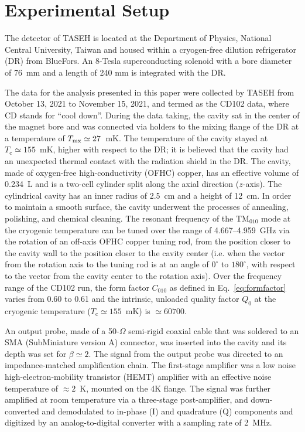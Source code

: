 
\section{Experimental Setup}\label{sec:taseh} 
The detector of TASEH is located at the Department of Physics, National 
Central University, Taiwan and housed within a cryogen-free dilution 
refrigerator (DR) from BlueFors. An 8-Tesla superconducting solenoid 
with a 
bore diameter of 76~mm and a length of 240 mm is integrated with the DR. 

The data for the analysis presented in this paper were collected by TASEH 
from October 13, 2021 to November 15, 2021, and termed as the CD102 data, 
where CD stands for ``cool down''. 
During the data taking, the cavity sat in the center of the magnet bore 
and was connected via holders to the mixing flange of the DR at a 
temperature of $T_{\rm mx}\simeq27$~mK. 
The temperature of the cavity stayed at $T_\text{c}\simeq155$~mK, higher 
with respect to the 
DR; it is believed that the cavity had an unexpected thermal contact with the 
radiation shield in the DR. 
The cavity, made of oxygen-free high-conductivity (OFHC) copper, has an 
effective volume of 0.234~L and is a two-cell cylinder split along 
the axial direction ($z$-axis). 
The cylindrical cavity has an inner radius of 2.5~cm and a 
height of 12~cm.  In order to maintain a smooth surface, the cavity underwent 
the processes of annealing, polishing, and chemical cleaning. The resonant 
frequency of the TM$_{010}$ mode at the cryogenic temperature 
can be tuned over the range of 
4.667--4.959~GHz via the rotation of an off-axis OFHC copper tuning rod, from 
the position closer to the cavity wall to the position closer to the cavity 
center (i.e. when the vector from the rotation axis to the tuning rod is 
at an angle of $0^\circ$ to $180^\circ$, with respect to the vector from the 
cavity center to the rotation axis). 
%
Over the frequency range of the CD102 run, the form factor $C_{010}$ as 
defined in Eq.~\eqref{eq:formfactor} varies from 0.60 to 0.61 and 
the intrinsic, unloaded quality factor $Q_0$ at the cryogenic temperature 
($T_\mathrm{c}\simeq 155$~mK) is $\simeq 60700$. 

An output probe, made of a 50-$\Omega$ semi-rigid coaxial cable that was 
soldered to an SMA (SubMiniature version A) connector, was inserted into the 
cavity and its depth was set for 
$\beta\simeq2$.  The signal from the output probe was directed to an 
impedance-matched amplification chain. The first-stage amplifier was 
a low noise high-electron-mobility transistor (HEMT) amplifier with an 
effective noise temperature of $\approx 2$~K, mounted on the 4K flange. 
The signal was further amplified at room temperature via a 
three-stage post-amplifier, and down-converted 
and demodulated to in-phase (I) and quadrature (Q) components and digitized 
by an analog-to-digital converter with a sampling rate of 2~MHz. 

